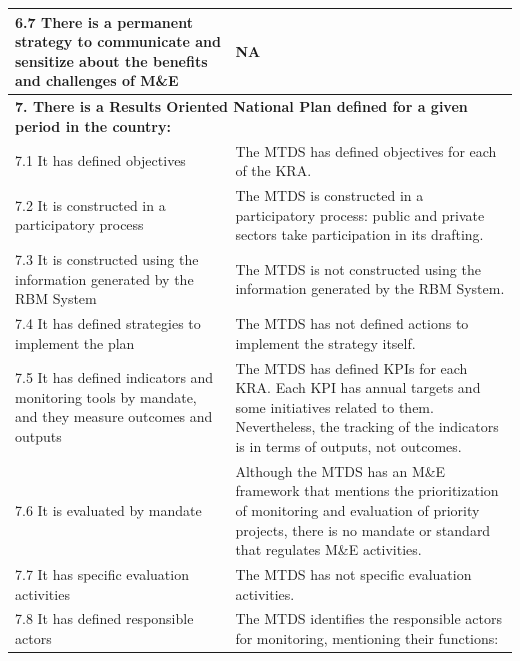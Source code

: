 \documentclass[
  10pt,
]{book}
\begin{document}
\begin{table}
\begin{tabular}[t]{l|l}
\hline
\hspace{1em}6.7 There is a permanent strategy to communicate and sensitize about the benefits and challenges of M\&E & NA\\
\hline
\multicolumn{2}{l}{\textbf{7. There is a Results Oriented National Plan defined for a given period in the country:}}\\
\hline
\hspace{1em}7.1 It has defined objectives & The MTDS has defined objectives for each of the KRA.\\
\hline
\hspace{1em}7.2 It is constructed in a participatory process & The MTDS is constructed in a participatory process: public and private sectors take participation in its drafting.\\
\hline
\hspace{1em}7.3 It is constructed using the information generated by the RBM System & The MTDS is not constructed using the information generated by the RBM System.\\
\hline
\hspace{1em}7.4 It has defined strategies to implement the plan & The MTDS has not defined actions to implement the strategy itself.\\
\hline
\hspace{1em}7.5 It has defined indicators and monitoring tools by mandate, and they measure outcomes and outputs & The MTDS has defined KPIs for each KRA. Each KPI has annual targets and some initiatives related to them. Nevertheless, the tracking of the indicators is in terms of outputs, not outcomes.\\
\hline
\hspace{1em}7.6 It is evaluated by mandate & Although the MTDS has an M\&E framework that mentions the prioritization of monitoring and evaluation of priority projects, there is no mandate or standard that regulates M\&E activities.\\
\hline
\hspace{1em}7.7 It has specific evaluation activities & The MTDS has not specific evaluation activities.\\
\hline
7.8 It has defined responsible actors & The MTDS identifies the responsible actors for monitoring, mentioning their functions:


\end{tabular}
\end{table}
\end{document}
